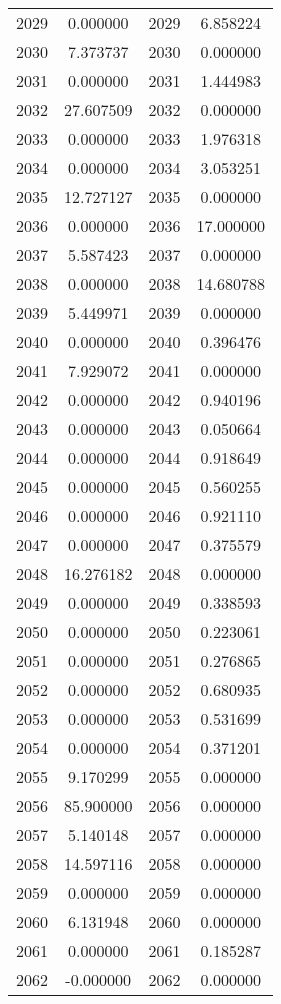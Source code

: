 \documentclass[12pt]{article}
\begin{document}
\begin{longtable}{@{}cccc@{}}
2029 & 0.000000 & 2029 & 6.858224 \\
2030 & 7.373737 & 2030 & 0.000000 \\
2031 & 0.000000 & 2031 & 1.444983 \\
2032 & 27.607509 & 2032 & 0.000000 \\
2033 & 0.000000 & 2033 & 1.976318 \\
2034 & 0.000000 & 2034 & 3.053251 \\
2035 & 12.727127 & 2035 & 0.000000 \\
2036 & 0.000000 & 2036 & 17.000000 \\
2037 & 5.587423 & 2037 & 0.000000 \\
2038 & 0.000000 & 2038 & 14.680788 \\
2039 & 5.449971 & 2039 & 0.000000 \\
2040 & 0.000000 & 2040 & 0.396476 \\
2041 & 7.929072 & 2041 & 0.000000 \\
2042 & 0.000000 & 2042 & 0.940196 \\
2043 & 0.000000 & 2043 & 0.050664 \\
2044 & 0.000000 & 2044 & 0.918649 \\
2045 & 0.000000 & 2045 & 0.560255 \\
2046 & 0.000000 & 2046 & 0.921110 \\
2047 & 0.000000 & 2047 & 0.375579 \\
2048 & 16.276182 & 2048 & 0.000000 \\
2049 & 0.000000 & 2049 & 0.338593 \\
2050 & 0.000000 & 2050 & 0.223061 \\
2051 & 0.000000 & 2051 & 0.276865 \\
2052 & 0.000000 & 2052 & 0.680935 \\
2053 & 0.000000 & 2053 & 0.531699 \\
2054 & 0.000000 & 2054 & 0.371201 \\
2055 & 9.170299 & 2055 & 0.000000 \\
2056 & 85.900000 & 2056 & 0.000000 \\
2057 & 5.140148 & 2057 & 0.000000 \\
2058 & 14.597116 & 2058 & 0.000000 \\
2059 & 0.000000 & 2059 & 0.000000 \\
2060 & 6.131948 & 2060 & 0.000000 \\
2061 & 0.000000 & 2061 & 0.185287 \\
2062 & -0.000000 & 2062 & 0.000000 \\

\end{longtable}
\end{document}
